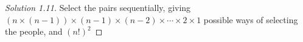 \documentclass{article}
\begin{document}
\begin{proof}[Solution 1.11]
    Select the pairs sequentially, giving $(n \times (n-1)) \times (n-1) \times (n-2) \times \cdots \times 2 \times 1$ 
    possible ways of selecting the people, and $(n!)^2$  
\end{proof}

 
 
\end{document}
